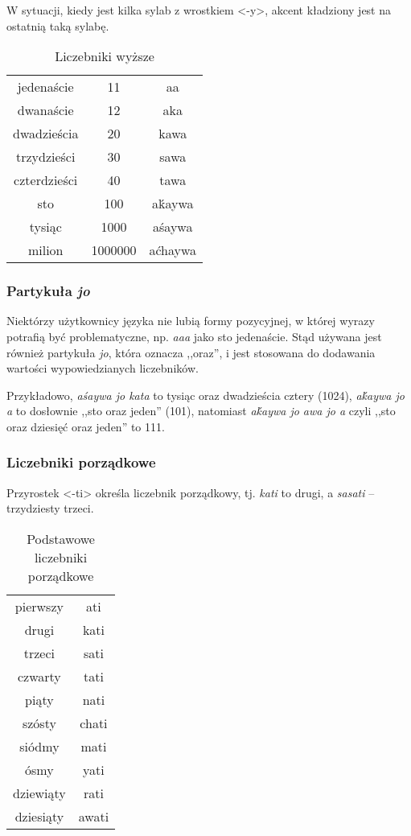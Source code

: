 \begin{spacing}{1.1}
W sytuacji, kiedy jest kilka sylab z wrostkiem <-y>, akcent kładziony jest na
ostatnią taką sylabę.

\begin{table}[ht]
	\centering
	\caption{Liczebniki wyższe}
	\begin{tabular}{ccc} \toprule
		jedenaście & 11 & aa \\
		dwanaście & 12 & aka \\
		dwadzieścia & 20 & kawa \\
		trzydzieści & 30 & sawa \\
		czterdzieści & 40 & tawa \\
		sto & 100 & aḱaywa  \\
		tysiąc & 1000 & aśaywa \\
		milion & 1000000 & aćhaywa \\\bottomrule
	\end{tabular}
	\label{tab:numerals2}
\end{table}

\subsubsection{Partykuła \emph{jo}}

Niektórzy użytkownicy języka nie lubią formy pozycyjnej, w której wyrazy
potrafią być problematyczne, np. \emph{aaa} jako sto jedenaście. Stąd używana
jest również partykuła \emph{jo}, która oznacza ,,oraz'', i jest stosowana do
dodawania wartości wypowiedzianych liczebników.

Przykładowo, \emph{aśaywa jo kata} to tysiąc oraz dwadzieścia cztery (1024),
\emph{aḱaywa jo a} to dosłownie ,,sto oraz jeden'' (101), natomiast
\emph{aḱaywa jo awa jo a} czyli ,,sto oraz dziesięć oraz jeden'' to 111.

\subsubsection{Liczebniki porządkowe}

Przyrostek <-ti> określa liczebnik porządkowy, tj. \emph{kati} to drugi, a
\emph{sasati} -- trzydziesty trzeci.

\begin{table}[ht]
\centering
\caption{Podstawowe liczebniki porządkowe}
\begin{tabular}{cc} \toprule
	pierwszy & ati \\
	drugi & kati \\
	trzeci & sati \\
	czwarty & tati \\
	piąty & nati \\
	szósty & chati \\
	siódmy & mati \\
	ósmy & yati \\
	dziewiąty & rati \\
	dziesiąty & awati \\\bottomrule
\end{tabular}
\label{tab:numerals3}
\end{table}


\end{spacing}
